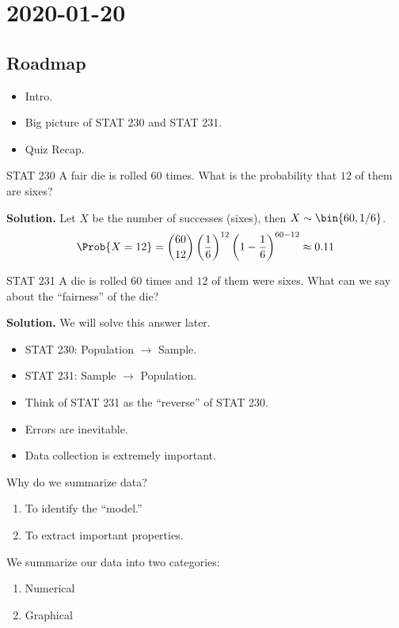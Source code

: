 \section{2020-01-20}
\subsection*{Roadmap}
\begin{itemize}
    \item Intro.
    \item Big picture of STAT 230 and STAT 231.
    \item Quiz Recap.
\end{itemize}
\begin{Example}{STAT 230}{}
    A fair die is rolled $ 60 $ times. What is the
    probability that $ 12 $ of them are sixes?

    \textbf{Solution.}
    Let $ X $ be the number of successes (sixes), then $ X \sim \bin{60,1/6} $.
    \[ \Prob{X=12}
        =\binom{60}{12}\left( \frac{1}{6}  \right)^{12}\left( 1-\frac{1}{6} \right)^{60-12}
        \approx 0.11\]
\end{Example}


\begin{Example}{STAT 231}{}
    A die is rolled $ 60 $ times and $ 12 $ of them were sixes.
    What can we say about the ``fairness'' of the die?

    \textbf{Solution.} We will solve this answer later.
\end{Example}

\begin{itemize}
    \item STAT 230: Population $ \rightarrow $ Sample.
    \item STAT 231: Sample $ \rightarrow $ Population.
    \item Think of STAT 231 as the ``reverse'' of STAT 230.
    \item Errors are inevitable.
    \item Data collection is extremely important.
\end{itemize}
Why do we summarize data?
\begin{enumerate}[(1)]
    \item To identify the ``model.''
    \item To extract important properties.
\end{enumerate}

We summarize our data into two categories:
\begin{enumerate}[label=(\arabic*)]
    \item Numerical
    \item Graphical
\end{enumerate}

